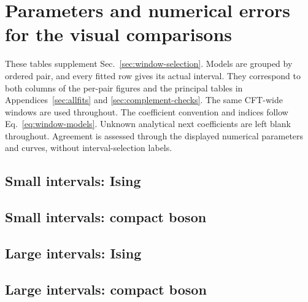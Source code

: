 \clearpage
\section{Parameters and numerical errors for the visual comparisons}
\label{sec:window-appendix}
These tables supplement Sec.~\ref{sec:window-selection}. Models are
grouped by ordered pair, and every fitted row gives its actual interval.
They correspond to both columns of the per-pair figures and the
principal tables in Appendices~\ref{sec:allfits} and
\ref{sec:complement-checks}. The same CFT-wide windows are used throughout.
The coefficient convention and indices follow
Eq.~\eqref{eq:window-models}. Unknown analytical next coefficients
are left blank throughout. Agreement is assessed through the displayed
numerical parameters and curves, without interval-selection labels.

\subsection{Small intervals: Ising}



\clearpage
\subsection{Small intervals: compact boson}



\clearpage
\subsection{Large intervals: Ising}



\clearpage
\subsection{Large intervals: compact boson}




\clearpage
